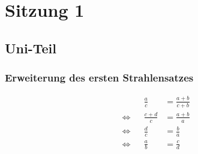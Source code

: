 \documentclass[11pt]{article}
\begin{document}
\section*{Sitzung 1}
\subsection*{Uni-Teil}
\subsubsection*{Erweiterung des ersten Strahlensatzes}
\begin{equation*}
\begin{aligned}
&& \frac{a}{c} &= \frac{a +b}{c + b}\\
\Leftrightarrow && \frac{c+d}{c} &= \frac{a+b}{a}\\
\Leftrightarrow && \frac{d}{c} &= \frac{b}{a}\\
\Leftrightarrow && \frac{a}{b} &= \frac{c}{d}
\end{aligned}
\end{equation*}
\end{document}
